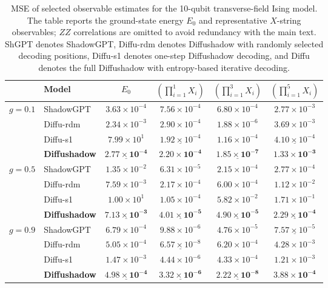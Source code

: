 \documentclass[11pt,a4paper]{article}
\begin{document}
\begin{table}[htbp]
\centering
\small
\caption{MSE of selected observable estimates for the 10-qubit transverse-field Ising model. The table reports the ground-state energy \(E_0\) and representative \(X\)-string observables; \(ZZ\) correlations are omitted to avoid redundancy with the main text. ShGPT denotes ShadowGPT, Diffu-rdm denotes Diffushadow with randomly selected decoding positions, Diffu-s1 denotes one-step Diffushadow decoding, and Diffu denotes the full Diffushadow with entropy-based iterative decoding.}
\label{tab:mse_table}
\begin{tabular}{llcccc}
\hline
 &Model & $E_0$ & $\left(\prod_{i=1}^1 X_i\right)$ & $\left(\prod_{i=1}^3 X_i\right)$ & $\left(\prod_{i=1}^5 X_i\right)$\\
\hline
\multirow{4}{*}{$g=0.1$} 
& ShadowGPT      & $3.63{\times}10^{-4}$ & $7.56{\times}10^{-4}$ & $6.80{\times}10^{-4}$ & $2.77{\times}10^{-3}$\\
& Diffu-rdm & $2.34{\times}10^{-3}$ & $2.90{\times}10^{-4}$ & $1.88{\times}10^{-6}$ & $3.69{\times}10^{-3}$\\
& Diffu-s1  & $7.99{\times}10^{1}$ & $\underline{1.92{\times}10^{-4}}$ & $1.16{\times}10^{-4}$ & $\underline{4.10{\times}10^{-4}}$\\
& \textbf{Diffushadow}    & $\underline{\mathbf{2.77{\times}10^{-4}}}$ & $\mathbf{2.20{\times}10^{-4}}$ & $\underline{\mathbf{1.85{\times}10^{-7}}}$ & $\mathbf{1.33{\times}10^{-3}}$\\
\hline
\multirow{4}{*}{$g=0.5$} 
& ShadowGPT      & $1.35{\times}10^{-2}$ & $6.31{\times}10^{-5}$ & $2.15{\times}10^{-4}$ & $2.77{\times}10^{-4}$\\
& Diffu-rdm & $7.59{\times}10^{-3}$ & $2.17{\times}10^{-4}$ & $6.00{\times}10^{-4}$ & $1.12{\times}10^{-2}$\\
& Diffu-s1  & $1.00{\times}10^{1}$ & $1.05{\times}10^{-4}$ & $5.82{\times}10^{-2}$ & $1.71{\times}10^{-1}$\\
& \textbf{Diffushadow}    & $\underline{\mathbf{7.13{\times}10^{-3}}}$ & $\underline{\mathbf{4.01{\times}10^{-5}}}$ & $\underline{\mathbf{4.90{\times}10^{-5}}}$ & $\underline{\mathbf{2.29{\times}10^{-4}}}$\\
\hline
\multirow{4}{*}{$g=0.9$} 
& ShadowGPT      & $6.79{\times}10^{-4}$ & $9.88{\times}10^{-6}$ & $4.76{\times}10^{-5}$ & $\underline{7.57{\times}10^{-5}}$\\
& Diffu-rdm & $5.05{\times}10^{-4}$ & $\underline{6.57{\times}10^{-8}}$ & $6.20{\times}10^{-4}$ & $4.28{\times}10^{-3}$\\
& Diffu-s1  & $1.47{\times}10^{-3}$ & $4.44{\times}10^{-6}$ & $4.33{\times}10^{-4}$ & $1.21{\times}10^{-3}$\\
& \textbf{Diffushadow}    & $\underline{\mathbf{4.98{\times}10^{-4}}}$ & $\underline{\mathbf{3.32{\times}10^{-6}}}$ & $\underline{\mathbf{2.22{\times}10^{-8}}}$ & $\mathbf{3.88{\times}10^{-4}}$\\
\hline
\end{tabular}
\end{table}
\end{document}
